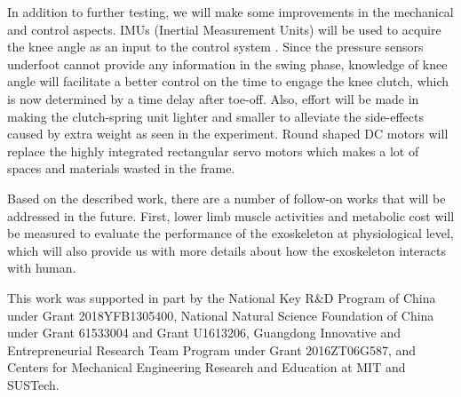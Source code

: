 \documentclass[twocolumn,cleanfoot,10pt]{asme2ej}
\begin{document}
In addition to further testing, we will make some improvements in the mechanical and control aspects.
IMUs (Inertial Measurement Units) will be used to acquire the knee angle as an input to the control system \cite{IMU2}.
Since the pressure sensors underfoot cannot provide any information in the swing phase, knowledge of knee angle will facilitate a better control on the time to engage the knee clutch, which is now determined by a time delay after toe-off.
Also, effort will be made in making the clutch-spring unit lighter and smaller to alleviate the side-effects caused by extra weight as seen in the experiment.
Round shaped DC motors will replace the highly integrated rectangular servo motors which makes a lot of spaces and materials wasted in the frame. 

Based on the described work, there are a number of follow-on works that will be addressed in the future.
First, lower limb muscle activities and metabolic cost will be measured to evaluate the performance of the exoskeleton at physiological level, which will also provide us with more details about how the exoskeleton interacts with human.

\begin{acknowledgment}
This work was supported in part by the National Key R\&D Program of China under Grant 2018YFB1305400, National Natural Science Foundation of China under Grant 61533004 and Grant U1613206, Guangdong Innovative and Entrepreneurial Research Team Program under Grant 2016ZT06G587, and Centers for Mechanical Engineering Research and Education at MIT and SUSTech.
\end{acknowledgment}

%



%


\clearpage
\listoffigures
\clearpage
\listoftables
\end{document}
